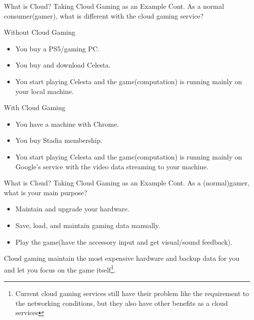\documentclass[aspectratio=169, 12pt]{beamer}
\begin{document}
\begin{frame}{What is Cloud? Taking Cloud Gaming as an Example Cont.}
As a normal consumer(gamer), what is different with the cloud gaming service?
\scriptsize
\begin{alertblock}{Without Cloud Gaming}
\begin{itemize}
\item You buy a PS5/gaming PC.
\item You buy and download Celesta.
\item You start playing Celesta and the game(computation) is running mainly on your local machine.
\end{itemize}
\end{alertblock}

\begin{alertblock}{With Cloud Gaming}
\begin{itemize}
\item You have a machine with Chrome.
\item You buy Stadia membership.
\item You start playing Celesta and the game(computation) is running mainly on Google's service with the video data streaming to your machine.
\end{itemize}
\end{alertblock}
\end{frame}

\begin{frame}{What is Cloud? Taking Cloud Gaming as an Example Cont.}
As a (normal)gamer, what is your main purpose?
\begin{itemize}
\item {} Maintain and upgrade your hardware.
\item {} Save, load, and maintain gaming data manually.
\item {} Play the game(have the accessory input and get visual/sound feedback).
\end{itemize}
\vfill
Cloud gaming maintain the most expensive hardware and backup data for you and let you focus on the game itself\footnote{\tiny Current cloud gaming services still have their problem like the requirement to the networking conditions, but they also have other benefits as a cloud services}.
\end{frame}
\end{document}
